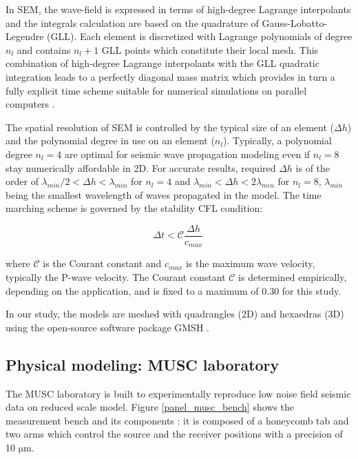 \documentclass[manuscript,revised]{geophysics}
\begin{document}
\noindent In SEM, the wave-field is expressed in terms of high-degree Lagrange interpolants and the integrals calculation are based on the quadrature of Gauss-Lobatto-Legendre (GLL). Each element is discretized with Lagrange polynomials of degree $n_{l}$ and contains $n_{l}+1$ GLL points which constitute their local mesh. This combination of high-degree Lagrange interpolants with the GLL quadratic integration leads to a perfectly diagonal mass matrix which provides in turn a fully explicit time scheme suitable for numerical simulations on parallel computers \citep{komatitsch1998spectral,komatitsch1999spectral}.

\noindent The spatial resolution of SEM is controlled by the typical size of an element ($\Delta h$) and the polynomial degree in use on an element ($n_{l}$). Typically, a polynomial degree $n_{l}=4$ are optimal for seismic wave propagation modeling \citep{moczo2011finite} even if $n_{l}=8$ stay numerically affordable in 2D. For accurate results, required $\Delta h$ is of the order of $\lambda_{min} /2 < \Delta h < \lambda_{min}$ for $n_{l}=4$ and $\lambda_{min} < \Delta h < 2\lambda_{min}$ for $n_{l}=8$, $\lambda_{min}$ being the smallest wavelength of waves propagated in the model. The time marching scheme is governed by the stability CFL condition:

\begin{equation}
	\Delta t < \mathcal{C}\frac{\Delta h}{c_{max}}\,   
\end{equation}

\noindent where $\mathcal{C}$ is the Courant constant and $c_{max}$ is the maximum wave velocity, typically the P-wave velocity. The Courant constant $\mathcal{C}$ is determined empirically, depending on the application, and is fixed to a maximum of 0.30 for this study.

\noindent In our study, the models are meshed with quadrangles (2D) and hexaedras (3D) using the open-source software package GMSH \citep{Geuzaine_MSH_2009}. 


\subsection{Physical modeling: MUSC laboratory}

\noindent The MUSC laboratory \citep{Bretaudeau_SSA_2008b,Bretaudeau_SSM_2011,Bretaudeau_FWI_2013} is built to experimentally reproduce low noise field seismic data on reduced scale model. Figure \ref{panel_musc_bench} shows the measurement bench and its components : it is composed of a honeycomb tab and two arms which control the source and the receiver positions with a precision of 10 $\mathrm{\mu m}$.
\end{document}
